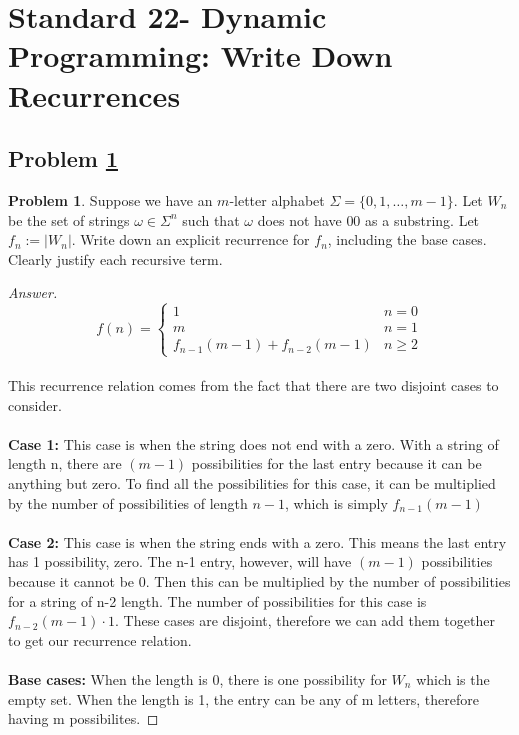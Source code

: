 \documentclass[11pt]{article}
\theoremstyle{definition}
\theoremstyle{definition}
\newtheorem{required}{Problem}
\theoremstyle{definition}
\begin{document}
\newpage
\section{Standard 22- Dynamic Programming: Write Down Recurrences}

\subsection{Problem \ref{DP3}}

\begin{required} \label{DP3}
Suppose we have an $m$-letter alphabet $\Sigma = \{0, 1, \ldots, m-1\}$. Let $W_{n}$ be the set of strings $\omega \in \Sigma^{n}$ such that $\omega$ does not have $00$ as a substring. Let $f_{n} := |W_{n}|$. Write down an explicit recurrence for $f_{n}$, including the base cases. Clearly justify each recursive term.
\end{required}

\begin{proof}[Answer]
\begin{equation}
  f(n)=\begin{cases}
    1 & n=0\\
    m & n=1 \\
    f_{n-1}(m-1) + f_{n-2}(m-1) & n\geq 2
  \end{cases}
\end{equation} \\
This recurrence relation comes from the fact that there are two disjoint cases to consider. \\ \\
\textbf{Case 1: }This case is when the string does not end with a zero. With a string of length n, there are $(m-1)$ possibilities for the last entry because it can be anything but zero. To find all the possibilities for this case, it can be multiplied by the number of possibilities of length $n-1$, which is simply $f_{n-1}(m-1)$ \\ \\
\textbf{Case 2: }This case is when the string ends with a zero. This means the last entry has 1 possibility, zero. The n-1 entry, however, will have $(m-1)$ possibilities because it cannot be 0. Then this can be multiplied by the number of possibilities for a string of n-2 length. The number of possibilities for this case is $f_{n-2}(m-1)\cdot 1$. These cases are disjoint, therefore we can add them together to get our recurrence relation. \\ \\
\textbf{Base cases: }When the length is 0, there is one possibility for $W_n$ which is the empty set. When the length is 1, the entry can be any of m letters, therefore having m possibilites. 
\end{proof}
\end{document}
